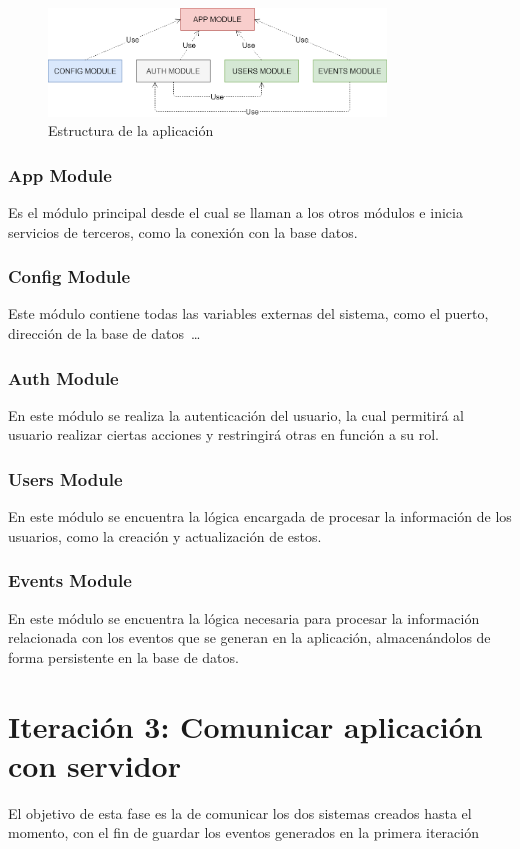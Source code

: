  \begin{figure}[h]
    \centering
    \includegraphics[width=0.8\textwidth, keepaspectratio]{imaxes/server_schema.png}
    \caption{Estructura de la aplicación}
    \label{fig:server_schema}
\end{figure}
 
 \subsubsection{App Module}
 Es el módulo principal desde el cual se llaman a los otros módulos e inicia servicios de terceros, como la conexión con la base datos.
 
 \subsubsection{Config Module}
Este módulo contiene todas las variables externas del sistema, como el puerto, dirección de la base de datos~\dots
 
 \subsubsection{Auth Module}
 En este módulo se realiza la autenticación del usuario, la cual permitirá al usuario realizar ciertas acciones y restringirá otras en función a su rol.
 
  \subsubsection{Users Module}
 En este módulo se encuentra la lógica encargada de procesar la información de los usuarios, como la creación y actualización de estos.
 
 \subsubsection{Events Module}
 En este módulo se encuentra la lógica necesaria para procesar la información relacionada con los eventos que se generan en la aplicación, almacenándolos de forma persistente en la base de datos.

\section{Iteración 3: Comunicar aplicación con servidor}
El objetivo de esta fase es la de comunicar los dos sistemas creados hasta el momento, con el fin de guardar los eventos generados en la primera iteración
      
